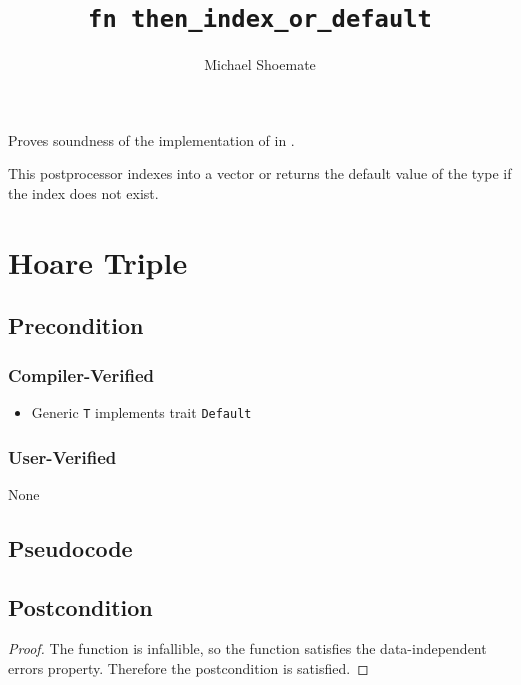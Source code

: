 \documentclass{article}
\title{\texttt{fn then\_index\_or\_default}}
\author{Michael Shoemate}
\date{}
\begin{document}
\maketitle

\contrib
Proves soundness of the implementation of  in .

This postprocessor indexes into a vector or returns the default value of the type if the index does not exist.
\section{Hoare Triple}
\subsection*{Precondition}
\subsubsection*{Compiler-Verified}
\begin{itemize}
    \item Generic \texttt{T} implements trait \texttt{Default}
\end{itemize}

\subsubsection*{User-Verified}
None

\subsection*{Pseudocode}


\subsection*{Postcondition}
\begin{theorem}
\end{theorem}

\begin{proof}
    The function is infallible, so the function satisfies the data-independent errors property.
    Therefore the postcondition is satisfied.
\end{proof}
\end{document}
